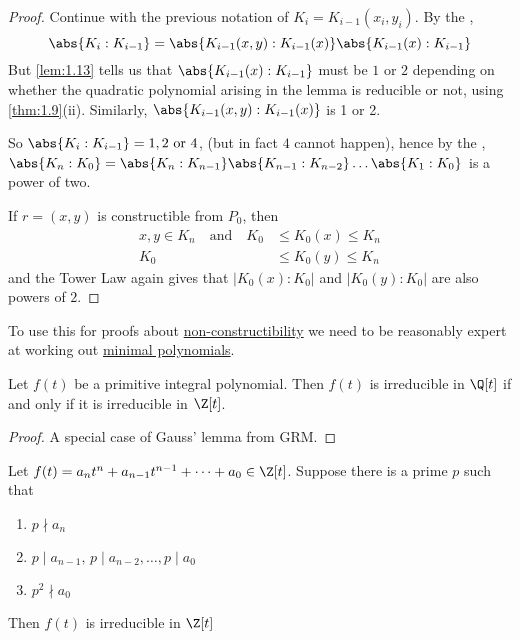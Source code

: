 \documentclass{article}
\begin{document}
\begin{proof}
    Continue with the previous notation of $K_i = K_{i-1}(x_i, y_i)$. By the ,
    \begin{equation*}
        \abs{K_i : K_{i-1}} = \abs{K_{i-1} (x, y): K_{i-1}(x)} \abs{K_{i-1}(x) : K_{i-1}}
    \end{equation*}
    But \cref{lem:1.13} tells us that $\abs{K_{i-1}(x):K_{i-1}}$ must be $1$ or $2$ depending on whether the quadratic polynomial arising in the lemma is reducible or not, using \cref{thm:1.9}(ii). Similarly, $\abs{K_{i-1}(x, y):K_{i-1}(x)}$ is 1 or 2.

    So $\abs{K_i: K_{i-1}} = 1, 2 \ \text{or} \ 4$, (but in fact $4$ cannot happen), hence by the , $\abs{K_n:K_0} = \abs{K_n:K_{n-1}} \abs{K_{n-1} : K_{n-2}} \dots \abs{K_1:K_0}$ is a power of two.

    If $r = (x, y)$ is constructible from $P_0$, then
    \begin{align*}
        x, y \in K_n \quad \text{and} \quad K_0 &\leq K_0(x) \leq K_n \\
        K_0 &\leq K_0(y) \leq K_n
    \end{align*}
    and the Tower Law again gives that $|K_0(x):K_0|$ and $|K_0(y):K_0|$ are also powers of $2$.
\end{proof}

To use this for proofs about \hyperlink{def:constructible}{non-constructibility} we need to be reasonably expert at working out \hyperlink{def:minimalPoly}{minimal polynomials}.

\begin{nthm}\label{thm:1.15}
    Let $f(t)$ be a primitive integral polynomial.  Then $f(t)$ is irreducible in $\Q[t]$ if and only if it is irreducible in $\Z[t]$.
\end{nthm}

\begin{proof}
    A special case of Gauss' lemma from GRM.
\end{proof}

\begin{nthm}\label{thm:1.16}
    Let $f(t) = a_n t^n + a_{n-1} t^{n-1} + \dots + a_0 \in \Z[t]$.
    Suppose there is a prime $p$ such that
    \begin{enumerate}[label=(\roman*)]
        \item $p \nmid a_n$
        \item $p \mid a_{n-1}, \, p \mid a_{n-2}, \dotsc, p \mid a_0$
        \item $p^2 \nmid a_0$
    \end{enumerate}
    Then $f(t)$ is irreducible in $\Z[t]$
\end{nthm}
\end{document}
